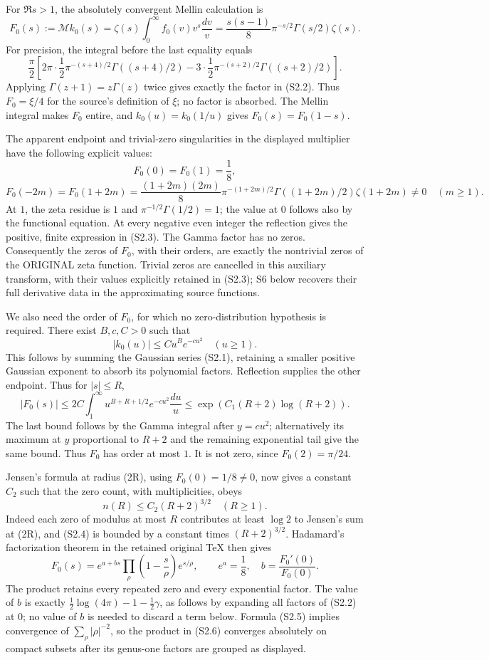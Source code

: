 \documentclass[
]{article}
\begin{document}
For \(\Re s>1\), the absolutely convergent Mellin calculation is \[
F_0(s):=\mathcal M k_0(s)
=\zeta(s)\int_0^\infty f_0(v)v^{s}\frac{dv}{v}
=\boxed{\frac{s(s-1)}8\pi^{-s/2}\Gamma(s/2)\zeta(s)}.
\tag{S2.2}
\] For precision, the integral before the last equality equals \[
\frac\pi2\left[
2\pi\cdot\frac12\pi^{-(s+4)/2}\Gamma((s+4)/2)
-3\cdot\frac12\pi^{-(s+2)/2}\Gamma((s+2)/2)
\right].
\] Applying \(\Gamma(z+1)=z\Gamma(z)\) twice gives exactly the factor in
(S2.2). Thus \(F_0=\xi/4\) for the source's definition of \(\xi\); no
factor is absorbed. The Mellin integral makes \(F_0\) entire, and
\(k_0(u)=k_0(1/u)\) gives \(F_0(s)=F_0(1-s)\).

The apparent endpoint and trivial-zero singularities in the displayed
multiplier have the following explicit values: \[
F_0(0)=F_0(1)=\frac18,
\] \[
F_0(-2m)=F_0(1+2m)
=\frac{(1+2m)(2m)}8\pi^{-(1+2m)/2}
\Gamma((1+2m)/2)\zeta(1+2m)\ne0\quad(m\ge1).
\tag{S2.3}
\] At \(1\), the zeta residue is \(1\) and \(\pi^{-1/2}\Gamma(1/2)=1\);
the value at \(0\) follows also by the functional equation. At every
negative even integer the reflection gives the positive, finite
expression in (S2.3). The Gamma factor has no zeros. Consequently the
zeros of \(F_0\), with their orders, are exactly the nontrivial zeros of
the ORIGINAL zeta function. Trivial zeros are cancelled in this
auxiliary transform, with their values explicitly retained in (S2.3); S6
below recovers their full derivative data in the approximating source
functions.

We also need the order of \(F_0\), for which no zero-distribution
hypothesis is required. There exist \(B,c,C>0\) such that \[
|k_0(u)|\le C u^B e^{-cu^2}\quad(u\ge1).
\] This follows by summing the Gaussian series (S2.1), retaining a
smaller positive Gaussian exponent to absorb its polynomial factors.
Reflection supplies the other endpoint. Thus for \(|s|\le R\), \[
|F_0(s)|\le2C\int_1^\infty u^{B+R+1/2}e^{-cu^2}\frac{du}{u}
\le \exp(C_1(R+2)\log(R+2)).
\tag{S2.4}
\] The last bound follows by the Gamma integral after \(y=cu^2\);
alternatively its maximum at \(y\) proportional to \(R+2\) and the
remaining exponential tail give the same bound. Thus \(F_0\) has order
at most \(1\). It is not zero, since \(F_0(2)=\pi/24\).

Jensen's formula at radius (2R), using \(F_0(0)=1/8\ne0\), now gives a
constant \(C_2\) such that the zero count, with multiplicities, obeys \[
n(R)\le C_2(R+2)^{3/2}\quad(R\ge1).
\tag{S2.5}
\] Indeed each zero of modulus at most \(R\) contributes at least
\(\log2\) to Jensen's sum at (2R), and (S2.4) is bounded by a constant
times \((R+2)^{3/2}\). Hadamard's factorization theorem in the retained
original TeX then gives \[
F_0(s)=e^{a+bs}\prod_\rho
\left(1-\frac{s}{\rho}\right)e^{s/\rho},
\qquad e^a=\frac18,\quad b=\frac{F_0'(0)}{F_0(0)}.
\tag{S2.6}
\] The product retains every repeated zero and every exponential factor.
The value of \(b\) is exactly \(\tfrac12\log(4\pi)-1-\tfrac12\gamma\),
as follows by expanding all factors of (S2.2) at \(0\); no value of
\(b\) is needed to discard a term below. Formula (S2.5) implies
convergence of \(\sum_\rho |\rho|^{-2}\), so the product in (S2.6)
converges absolutely on compact subsets after its genus-one factors are
grouped as displayed.
\end{document}

